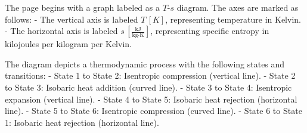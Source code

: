 The page begins with a graph labeled as a \( T \)-\( s \) diagram. The axes are marked as follows:  
- The vertical axis is labeled \( T \, [K] \), representing temperature in Kelvin.  
- The horizontal axis is labeled \( s \, \left[\frac{\text{kJ}}{\text{kg·K}}\right] \), representing specific entropy in kilojoules per kilogram per Kelvin.  

The diagram depicts a thermodynamic process with the following states and transitions:  
- State 1 to State 2: Isentropic compression (vertical line).  
- State 2 to State 3: Isobaric heat addition (curved line).  
- State 3 to State 4: Isentropic expansion (vertical line).  
- State 4 to State 5: Isobaric heat rejection (horizontal line).  
- State 5 to State 6: Isentropic compression (curved line).  
- State 6 to State 1: Isobaric heat rejection (horizontal line).